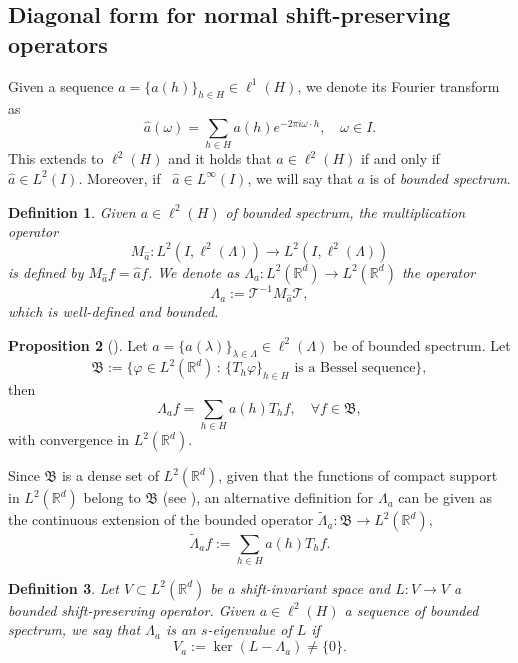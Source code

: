 \documentclass[a4paper,11pt]{amsart}
\newtheorem{fed}{Definition}[section]
\theoremstyle{definition}
\newtheorem{pro}[fed]{Proposition}
\theoremstyle{definition}
\def\la{\lambda}
\def\La{\Lambda}
\def\w{\omega}
\def\R{\mathbb{R}}
\begin{document}
\bigskip

\subsection{Diagonal form for normal shift-preserving operators}

Given a sequence $a=\{a(h)\}_{h\in H}\in\ell^1(H)$, we denote its Fourier transform as
$$\hat{a}(\w)=\sum_{h\in H }a(h)e^{-2\pi i \w \cdot h},\quad \w\in I.$$ 
This extends to $\ell^2(H)$ and it holds that  $a\in\ell^2(H)$ if and only if $\hat{a} \in L^2(I)$. Moreover, if \ $\hat{a}\in L^{\infty}(I)$, we will say that $a$ is of  \textit{bounded spectrum}.

\begin{fed}\label{def:Lambda_a}
	Given $a\in\ell^2(H)$ of bounded spectrum, the multiplication operator $$M_{\hat{a}}:L^2( I,\ell^2(\La))\to L^2( I,\ell^2(\La))$$ is defined by $M_{\hat{a}} f = \hat{a}f$. We denote as $\Lambda_a:L^2(\R^d)\to L^2(\R^d)$ the operator $$\Lambda_a:=\mathcal T^{-1} M_{\hat{a}} \mathcal T,$$ 
	which is well-defined and bounded. 
\end{fed}

\begin{pro}[{\cite[Proposition 3.2]{BCCHM}}]
	Let $a=\{a(\la)\}_{\la\in \La}\in\ell^2(\La)$ be of bounded spectrum. Let $$\mathfrak B  :=\{\varphi\in L^2(\R^d)\,:\, \{T_h\varphi\}_{h\in H} \text{ is a Bessel sequence}\},$$
	then $$\Lambda_a f =\sum_{h\in H}a(h)T_h f, \quad \forall f\in\mathfrak B, $$
	with convergence in $L^2(\R^d)$.
\end{pro}

Since $\mathfrak B$ is a dense set of $L^2(\R^d)$, given that the functions of compact support in $L^2(\R^d)$ belong to $\mathfrak B$ (see \cite[Proposition 9.3.4]{Chr2003}), an alternative definition for $\Lambda_a$ can be given as the continuous extension of the bounded operator $\tilde\Lambda_a:\mathfrak{B}\to L^2(\R^d)$, 
\begin{equation}\label{eq:tilde-Lambda_a}
	\tilde\Lambda_a f := \sum_{h\in H}a(h)T_h f.
\end{equation}

\begin{fed}\label{s-eigenval}
	Let $V \subset L^2(\R^d)$ be a shift-invariant space and $L:V\rightarrow V$ a bounded shift-preserving operator. Given $a\in \ell^{2}(H)$ a sequence of bounded spectrum, we say that $\Lambda_a$ is an $s$-eigenvalue of $L$ if
	\begin{equation*} 
		V_a := \ker\left(L - \Lambda_a\right)\neq\{0\}.
	\end{equation*}
\end{fed} 
\end{document}
